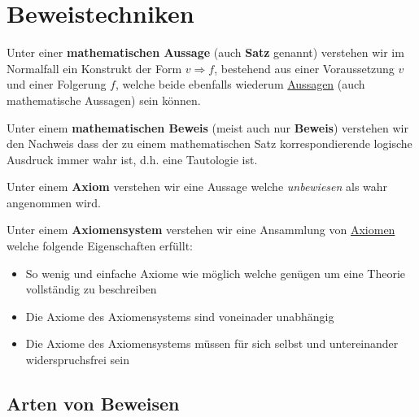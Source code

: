 \documentclass[../../main.tex]{subfiles}
\begin{document}
	
	\chapter{Beweistechniken}
	
	\begin{definition}
		\label{def:MathematischeAussage}
		Unter einer \textbf{mathematischen Aussage} (auch \textbf{Satz} genannt) verstehen wir im Normalfall ein Konstrukt der Form $v \Rightarrow f$, bestehend aus einer Voraussetzung $v$ und einer Folgerung $f$, welche beide ebenfalls wiederum \hyperref[def:Aussage]{Aussagen} (auch mathematische Aussagen) sein können.
	\end{definition}

	\begin{definition}
		\label{def:MathematischerBeweis}
		Unter einem \textbf{mathematischen Beweis} (meist auch nur \textbf{Beweis}) verstehen wir den Nachweis dass der zu einem mathematischen Satz korrespondierende logische Ausdruck immer wahr ist, d.h. eine Tautologie ist.
	\end{definition}

	\begin{definition}[Axiom]
		\label{def:Axiom}
		Unter einem \textbf{Axiom} verstehen wir eine Aussage welche \textit{unbewiesen} als wahr angenommen wird. 
	\end{definition}

	\begin{definition}[Axiomensystem]
		\label{def:Axiomensystem}
		Unter einem \textbf{Axiomensystem} verstehen wir eine Ansammlung von \hyperref[def:Axiom]{Axiomen} welche folgende Eigenschaften erfüllt:
		\begin{itemize}
			\item So wenig und einfache Axiome wie möglich welche genügen um eine Theorie vollständig zu beschreiben
			\item Die Axiome des Axiomensystems sind voneinader unabhängig
			\item Die Axiome des Axiomensystems müssen für sich selbst und untereinander widerspruchsfrei sein
		\end{itemize}
	\end{definition}



	\section{Arten von Beweisen}
	
\end{document}
